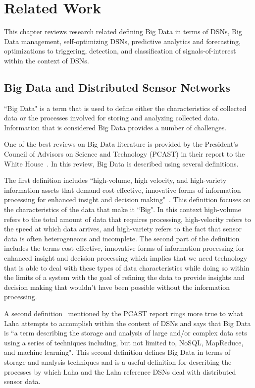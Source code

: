 \chapter{Related Work}\label{ch:related-work}
This chapter reviews research related defining Big Data in terms of DSNs, Big Data management, self-optimizing DSNs, predictive analytics and forecasting, optimizations to triggering, detection, and classification of signals-of-interest within the context of DSNs.

\section{Big Data and Distributed Sensor Networks}\label{sec:big-data-and-distributed-sensor-networks}
``Big Data" is a term that is used to define either the characteristics of collected data or the processes involved for storing and analyzing collected data. Information that is considered Big Data provides a number of challenges.

One of the best reviews on Big Data literature is provided by the President's Council of Advisors on Science and Technology (PCAST) in their report to the White House~\cite{house2014big}. In this review, Big Data is described using several definitions.

The first definition includes ``high-volume, high velocity, and high-variety information assets that demand cost-effective, innovative forms of information processing for enhanced insight and decision making"~\cite{gartner_it_glossary_2016}. This definition focuses on the characteristics of the data that make it ``Big". In this context high-volume refers to the total amount of data that requires processing, high-velocity refers to the speed at which data arrives, and high-variety refers to the fact that sensor data is often heterogeneous and incomplete. The second part of the definition includes the terms cost-effective, innovative forms of information processing for enhanced insight and decision processing which implies that we need technology that is able to deal with these types of data characteristics while doing so within the limits of a system with the goal of refining the data to provide insights and decision making that wouldn't have been possible without the information processing.

A second definition~\cite{ward2013undefined} mentioned by the PCAST report rings more true to what Laha attempts to accomplish within the context of DSNs and says that Big Data is ``a term describing the storage and analysis of large and/or complex data sets using a series of techniques including, but not limited to, NoSQL, MapReduce, and machine learning". This second definition defines Big Data in terms of storage and analysis techniques and is a useful definition for describing the processes by which Laha and the Laha reference DSNs deal with distributed sensor data.

